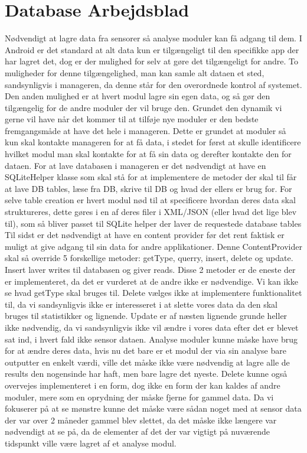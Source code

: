 \section{Database Arbejdsblad}
Nødvendigt at lagre data fra sensorer så analyse moduler kan få adgang til dem.
I Android er det standard at alt data kun er tilgængeligt til den specifikke app der har lagret det, dog er der mulighed for selv at gøre det tilgængeligt for andre.
To muligheder for denne tilgængelighed, man kan samle alt dataen et sted, sandsynligvis i manageren, da denne står for den overordnede kontrol af systemet.
Den anden mulighed er at hvert modul lagre sin egen data, og så gør den tilgængelig for de andre moduler der vil bruge den.
Grundet den dynamik vi gerne vil have når det kommer til at tilføje nye moduler er den bedste fremgangsmåde at have det hele i manageren.
Dette er grundet at moduler så kun skal kontakte manageren for at få data, i stedet for først at skulle identificere hvilket modul man skal kontakte for at få sin data og derefter kontakte den for dataen.
For at lave databasen i manageren er det nødvendigt at have en SQLiteHelper klasse som skal stå for at implementere de metoder der skal til får at lave DB tables, læse fra DB, skrive til DB og hvad der ellers er brug for.
For selve table creation er hvert modul nød til at specificere hvordan deres data skal struktureres, dette gøres i en af deres filer i XML/JSON (eller hvad det lige blev til), som så bliver passet til SQLite helper der laver de requestede database tables
Til sidst er det nødvendigt at have en content provider før det rent faktisk er muligt at give adgang til sin data for andre applikationer.
Denne ContentProvider skal så override 5 forskellige metoder:  getType, querry, insert, delete og update.
Insert laver writes til databasen og giver reads.
Disse 2 metoder er de eneste der er implementeret, da det er vurderet at de andre ikke er nødvendige.
Vi kan ikke se hvad getType skal bruges til.
Delete vælges ikke at implementere funktionalitet til, da vi sandsynligvis ikke er interesseret i at slette vores data da den skal bruges til statistikker og lignende.
Update er af næsten lignende grunde heller ikke nødvendig, da vi sandsynligvis ikke vil ændre i vores data efter det er blevet sat ind, i hvert fald ikke sensor dataen.
Analyse moduler kunne måske have brug for at ændre deres data, hvis nu det bare er et modul der via sin analyse bare outputter en enkelt værdi, ville det måske ikke være nødvendig at lagre alle de results den nogensinde har haft, men bare lagre det nyeste.
Delete kunne også overvejes implementeret i en form, dog ikke en form der kan kaldes af andre moduler, mere som en oprydning der måske fjerne for gammel data. Da vi fokuserer på at se mønstre kunne det måske være sådan noget med at sensor data der var over 2 måneder gammel blev slettet, da det måske ikke længere var nødvendigt at se på, da de elementer af det der var vigtigt på nuværende tidspunkt ville være lagret af et analyse modul.